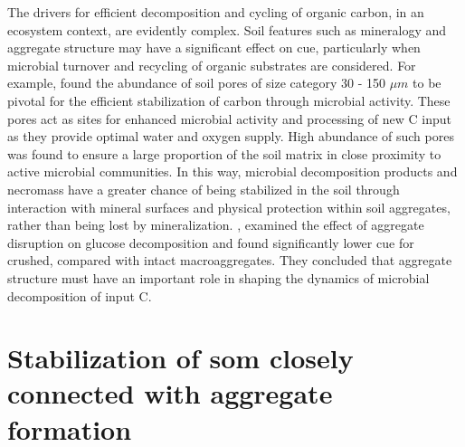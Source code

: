 \documentclass[12pt]{report}
\begin{document}
		The drivers for efficient decomposition and cycling of organic carbon, in an ecosystem context, are evidently complex.
		Soil features such as mineralogy and aggregate structure may have a significant effect on \gls{cue}, particularly when microbial turnover and recycling of organic substrates are considered. For example, \citet{kravchenko2019} found the abundance of soil pores of size category 30 - 150 $ \mu m $ to be pivotal for the efficient stabilization of carbon through microbial activity. These pores act as sites for enhanced microbial activity and processing of new C input as they provide optimal water and oxygen supply. High abundance of such pores was found to ensure a large proportion of the soil matrix in close proximity to active microbial communities. In this way, microbial decomposition products and necromass have a greater chance of being stabilized in the soil through interaction with mineral surfaces and physical protection within soil aggregates, rather than being lost by mineralization.
		\citet{tian2015}, examined the effect of aggregate disruption on glucose decomposition and found significantly lower \gls{cue} for crushed, compared with intact macroaggregates. They concluded that aggregate structure must have an important role in shaping the dynamics of microbial decomposition of input C.
		
		\section{Stabilization of \gls{som} closely connected with aggregate formation}
		
\end{document}
